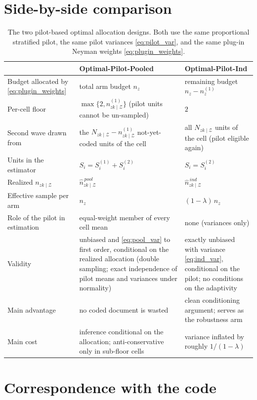 \documentclass[12pt]{article}
\theoremstyle{remark}
\newcommand{\NzkZ}{N_{zk \mid\mathcal{Z}}}
\newcommand{\nzkZ}{n_{zk \mid\mathcal{Z}}}
\newcommand{\npzkZ}{n^{(1)}_{zk \mid \mathcal{Z}}}
\newcommand{\npoolzkZ}{\hat{n}^{\,pool}_{zk \mid \mathcal{Z}}}
\newcommand{\nindzkZ}{\hat{n}^{\,ind}_{zk \mid \mathcal{Z}}}
\begin{document}
\section{Side-by-side comparison}

\begin{table}[H]
\centering
\small
\renewcommand{\arraystretch}{1.25}
\begin{tabular}{@{}L{3.6cm}L{5.6cm}L{5.6cm}@{}}
\toprule
 & \textbf{Optimal-Pilot-Pooled} & \textbf{Optimal-Pilot-Ind} \\
\midrule
Budget allocated by \eqref{eq:plugin_weights} & total arm budget $n_z$ & remaining budget $n_z - n^{(1)}_z$ \\
Per-cell floor & $\max\{2, \npzkZ\}$ (pilot units cannot be un-sampled) & $2$ \\
Second wave drawn from & the $\NzkZ - \npzkZ$ not-yet-coded units of the cell & all $\NzkZ$ units of the cell (pilot eligible again) \\
Units in the estimator & $S_i = S^{(1)}_i + S^{(2)}_i$ & $S_i = S^{(2)}_i$ \\
Realized $\nzkZ$ & $\npoolzkZ$ & $\nindzkZ$ \\
Effective sample per arm & $n_z$ & $(1-\lambda)\, n_z$ \\
Role of the pilot in estimation & equal-weight member of every cell mean & none (variances only) \\
Validity & unbiased and \eqref{eq:pool_var} to first order, conditional on the realized allocation (double sampling; exact independence of pilot means and variances under normality) & exactly unbiased with variance \eqref{eq:ind_var}, conditional on the pilot; no conditions on the adaptivity \\
Main advantage & no coded document is wasted & clean conditioning argument; serves as the robustness arm \\
Main cost & inference conditional on the allocation; anti-conservative only in sub-floor cells & variance inflated by roughly $1/(1-\lambda)$ \\
\bottomrule
\end{tabular}
\caption{The two pilot-based optimal allocation designs. Both use the same proportional stratified pilot, the same pilot variances \eqref{eq:pilot_var}, and the same plug-in Neyman weights \eqref{eq:plugin_weights}.}
\label{tab:compare}
\end{table}

\section{Correspondence with the code}
\label{sec:code}
\end{document}
